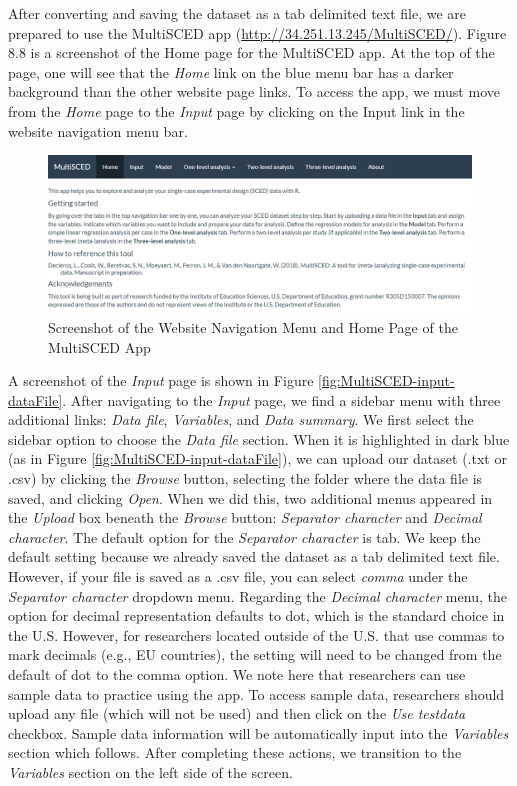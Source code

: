 \documentclass[
]{book}
\begin{document}
After converting and saving the dataset as a tab delimited text file, we are prepared to use the MultiSCED app (\url{http://34.251.13.245/MultiSCED/}). Figure 8.8 is a screenshot of the Home page for the MultiSCED app. At the top of the page, one will see that the \emph{Home} link on the blue menu bar has a darker background than the other website page links. To access the app, we must move from the \emph{Home} page to the \emph{Input} page by clicking on the Input link in the website navigation menu bar.

\begin{figure}
\includegraphics[width=0.6\linewidth]{images/multiSCED.homepage} \caption{Screenshot of the Website Navigation Menu and Home Page of the MultiSCED App}\label{fig:MultiSCED-navigation-homepage}
\end{figure}

A screenshot of the \emph{Input} page is shown in Figure \ref{fig:MultiSCED-input-dataFile}. After navigating to the \emph{Input} page, we find a sidebar menu with three additional links: \emph{Data file}, \emph{Variables}, and \emph{Data summary}. We first select the sidebar option to choose the \emph{Data file} section. When it is highlighted in dark blue (as in Figure \ref{fig:MultiSCED-input-dataFile}), we can upload our dataset (.txt or .csv) by clicking the \emph{Browse} button, selecting the folder where the data file is saved, and clicking \emph{Open}. When we did this, two additional menus appeared in the \emph{Upload} box beneath the \emph{Browse} button: \emph{Separator character} and \emph{Decimal character}. The default option for the \emph{Separator character} is tab. We keep the default setting because we already saved the dataset as a tab delimited text file. However, if your file is saved as a .csv file, you can select \emph{comma} under the \emph{Separator character} dropdown menu. Regarding the \emph{Decimal character} menu, the option for decimal representation defaults to dot, which is the standard choice in the U.S. However, for researchers located outside of the U.S. that use commas to mark decimals (e.g., EU countries), the setting will need to be changed from the default of dot to the comma option. We note here that researchers can use sample data to practice using the app. To access sample data, researchers should upload any file (which will not be used) and then click on the \emph{Use testdata} checkbox. Sample data information will be automatically input into the \emph{Variables} section which follows. After completing these actions, we transition to the \emph{Variables} section on the left side of the screen.
\end{document}
